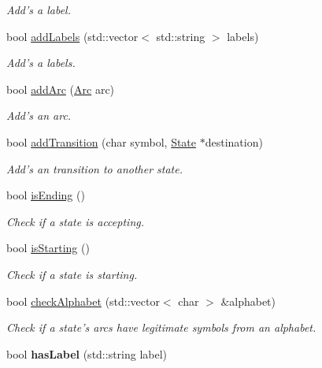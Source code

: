 \begin{DoxyCompactItemize}
\begin{DoxyCompactList}\small\item\em Add's a label. \end{DoxyCompactList}\item 
bool \hyperlink{classFA_1_1State_a88eafb3fcc1d0367a7822348453a4bed}{add\-Labels} (std\-::vector$<$ std\-::string $>$ labels)
\begin{DoxyCompactList}\small\item\em Add's a labels. \end{DoxyCompactList}\item 
bool \hyperlink{classFA_1_1State_a7e2d9168549d3cd40885d88fc51f27db}{add\-Arc} (\hyperlink{classFA_1_1Arc}{Arc} arc)
\begin{DoxyCompactList}\small\item\em Add's an arc. \end{DoxyCompactList}\item 
bool \hyperlink{classFA_1_1State_abea0dc69c3aec679e22b375928468f6f}{add\-Transition} (char symbol, \hyperlink{classFA_1_1State}{State} $\ast$destination)
\begin{DoxyCompactList}\small\item\em Add's an transition to another state. \end{DoxyCompactList}\item 
bool \hyperlink{classFA_1_1State_a5e4faae4fd5229971523feb39e7186dc}{is\-Ending} ()
\begin{DoxyCompactList}\small\item\em Check if a state is accepting. \end{DoxyCompactList}\item 
bool \hyperlink{classFA_1_1State_a62e1733d123a4630aa924b35e3edd958}{is\-Starting} ()
\begin{DoxyCompactList}\small\item\em Check if a state is starting. \end{DoxyCompactList}\item 
bool \hyperlink{classFA_1_1State_a2033665743bc46791dfa75bb288e4f21}{check\-Alphabet} (std\-::vector$<$ char $>$ \&alphabet)
\begin{DoxyCompactList}\small\item\em Check if a state's arcs have legitimate symbols from an alphabet. \end{DoxyCompactList}\item 
\hypertarget{classFA_1_1State_a83305d7232413989861458f91502302e}{bool {\bfseries has\-Label} (std\-::string label)}\label{classFA_1_1State_a83305d7232413989861458f91502302e}


\end{DoxyCompactItemize}
